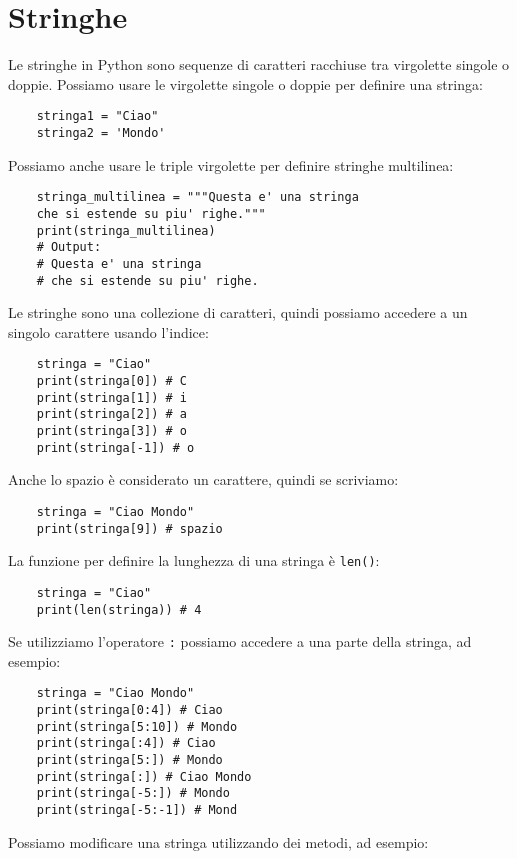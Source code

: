 \documentclass[a4paper,12pt]{article}
\begin{document}
\section{Stringhe}
Le stringhe in Python sono sequenze di caratteri racchiuse tra virgolette singole o doppie.
Possiamo usare le virgolette singole o doppie per definire una stringa:
\begin{lstlisting}
    stringa1 = "Ciao"
    stringa2 = 'Mondo'
\end{lstlisting}
Possiamo anche usare le triple virgolette per definire stringhe multilinea:
\begin{lstlisting}
    stringa_multilinea = """Questa e' una stringa
    che si estende su piu' righe."""
    print(stringa_multilinea)
    # Output:
    # Questa e' una stringa
    # che si estende su piu' righe.
\end{lstlisting}
\vspace{1em}
Le stringhe sono una collezione di caratteri, quindi possiamo accedere a un singolo carattere usando l'indice:
\begin{lstlisting}
    stringa = "Ciao"
    print(stringa[0]) # C
    print(stringa[1]) # i
    print(stringa[2]) # a
    print(stringa[3]) # o
    print(stringa[-1]) # o
\end{lstlisting}
Anche lo spazio è considerato un carattere, quindi se scriviamo:
\begin{lstlisting}
    stringa = "Ciao Mondo"
    print(stringa[9]) # spazio
\end{lstlisting}
\vspace{1em}
La funzione per definire la lunghezza di una stringa è \texttt{len()}:
\begin{lstlisting}
    stringa = "Ciao"
    print(len(stringa)) # 4
\end{lstlisting}
\vspace{1em}
Se utilizziamo l'operatore \texttt{:} possiamo accedere a una parte della stringa, ad esempio:
\begin{lstlisting}
    stringa = "Ciao Mondo"
    print(stringa[0:4]) # Ciao
    print(stringa[5:10]) # Mondo
    print(stringa[:4]) # Ciao
    print(stringa[5:]) # Mondo
    print(stringa[:]) # Ciao Mondo
    print(stringa[-5:]) # Mondo
    print(stringa[-5:-1]) # Mond
\end{lstlisting}
\vspace{1em}
Possiamo modificare una stringa utilizzando dei metodi, ad esempio:
\end{document}
